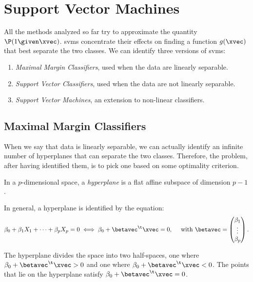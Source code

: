 \chapter{Support Vector Machines}

All the methods analyzed so far try to approximate the quantity $\P(1 \given \xvec)$. \acsp{svm} concentrate their effects on finding a function $g(\xvec)$ that best separate the two classes. We can identify three versions of \acsp{svm}:
\begin{enumerate}
    \item \emph{Maximal Margin Classifiers}, used when the data are linearly separable.
    \item \emph{Support Vector Classifiers}, used when the data are not linearly separable.
    \item \emph{Support Vector Machines}, an extension to non-linear classifiers.
\end{enumerate}

\section{Maximal Margin Classifiers}

When we say that data is linearly separable, we can actually identify an infinite number of hyperplanes that can separate the two classes. Therefore, the problem, after having identified them, is to pick one based on some optimality criterion.

\begin{definition*}[Hyperplane]
    In a $p$-dimensional space, a \emph{hyperplane} is a flat affine subspace of dimension $p-1$.
\end{definition*}

In general, a hyperplane is identified by the equation:
\begin{equation}
    \beta_0 + \beta_1 X_1 + \dots + \beta_p X_p = 0 \iff \beta_0 + \betavec^\t\xvec = 0,\quad\text{ with } \betavec = \begin{pmatrix}
        \beta_1 \\
        \vdots  \\
        \beta_p
    \end{pmatrix}.
\end{equation}

The hyperplane divides the space into two half-spaces, one where $\beta_0 + \betavec^\t\xvec > 0$ and one where $\beta_0 + \betavec^\t\xvec < 0$. The points that lie on the hyperplane satisfy $\beta_0 + \betavec^\t\xvec = 0$.

